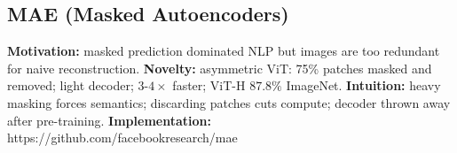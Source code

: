 \documentclass[11pt,a4paper]{article}
\begin{document}
\subsection{MAE (Masked Autoencoders)}
\textbf{Motivation:} masked prediction dominated NLP but images are too redundant
for naive reconstruction.
\textbf{Novelty:} asymmetric ViT: 75\% patches masked and removed; light decoder;
$3$-$4\times$ faster; ViT-H $87.8\%$ ImageNet.
\textbf{Intuition:} heavy masking forces semantics; discarding patches cuts compute;
decoder thrown away after pre-training.
\textbf{Implementation:}\\
https://github.com/facebookresearch/mae
\end{document}
